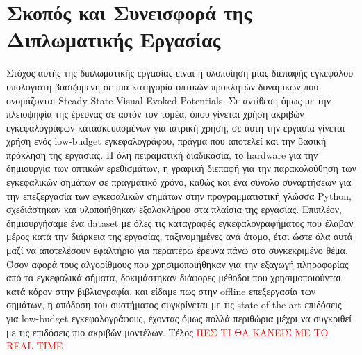 \documentclass[11pt,a4paper,english,greek,twoside]{../Thesis}
\begin{document}
\section{Σκοπός και Συνεισφορά της Διπλωματικής Εργασίας}
Στόχος αυτής της διπλωματικής εργασίας είναι η υλοποίηση μιας διεπαφής εγκεφάλου υπολογιστή βασιζόμενη σε μια κατηγορία οπτικών προκλητών δυναμικών που ονομάζονται Steady State Visual Evoked Potentials. Σε αντίθεση όμως με την πλειοψηφία της έρευνας σε αυτόν τον τομέα, όπου γίνεται χρήση ακριβών εγκεφαλογράφων κατασκευασμένων για ιατρική χρήση, σε αυτή την εργασία γίνεται χρήση ενός low-budget εγκεφαλογράφου, πράγμα που αποτελεί και την βασική πρόκληση της εργασίας. Η όλη πειραματική διαδικασία, το hardware για την δημιουργία των οπτικών ερεθισμάτων, η γραφική διεπαφή για την παρακολούθηση των εγκεφαλικών σημάτων σε πραγματικό χρόνο, καθώς και ένα σύνολο συναρτήσεων για την επεξεργασία των εγκεφαλικών σημάτων στην προγραμματιστική γλώσσα Python, σχεδιάστηκαν και υλοποιήθηκαν εξολοκλήρου στα πλαίσια της εργασίας. Επιπλέον, δημιουργήσαμε ένα dataset με όλες τις καταγραφές εγκεφαλογραφήματος που έλαβαν μέρος κατά την διάρκεια της εργασίας, ταξινομημένες ανά άτομο, έτσι ώστε όλα αυτά μαζί να αποτελέσουν εφαλτήριο για περαιτέρω έρευνα πάνω στο συγκεκριμένο θέμα. Όσον αφορά τους αλγορίθμους που χρησιμοποιήθηκαν για την εξαγωγή πληροφορίας από τα εγκεφαλικά σήματα, δοκιμάστηκαν διάφορες μέθοδοι που χρησιμοποιούνται κατά κόρον στην βιβλιογραφία, και είδαμε πως στην offline επεξεργασία των σημάτων, η απόδοση του συστήματος συγκρίνεται με τις state-of-the-art επιδόσεις για low-budget εγκεφαλογράφους, έχοντας όμως πολλά περιθώρια μέχρι να συγκριθεί με τις επιδόσεις πιο ακριβών μοντέλων. Τέλος \textcolor{red}{ΠΕΣ ΤΙ ΘΑ ΚΑΝΕΙΣ ΜΕ ΤΟ REAL TIME}
\end{document}
